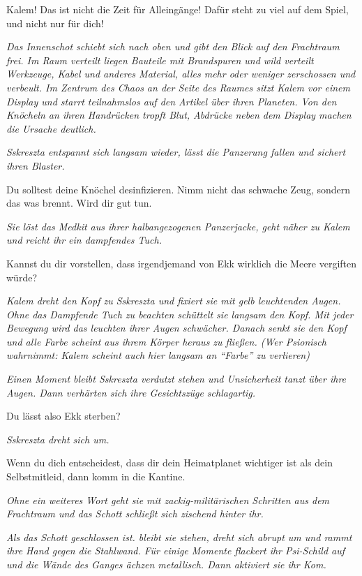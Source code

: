 \documentclass[11pt]{article}
\begin{document}
Kalem! Das ist nicht die Zeit für Alleingänge! Dafür steht zu viel auf
dem Spiel, und nicht nur für dich!

\emph{Das Innenschot schiebt sich nach oben und gibt den Blick auf den
Frachtraum frei. Im Raum verteilt liegen Bauteile mit Brandspuren und
wild verteilt Werkzeuge, Kabel und anderes Material, alles mehr oder
weniger zerschossen und verbeult. Im Zentrum des Chaos an der Seite des
Raumes sitzt Kalem vor einem Display und starrt teilnahmslos auf den
Artikel über ihren Planeten. Von den Knöcheln an ihren Handrücken tropft
Blut, Abdrücke neben dem Display machen die Ursache deutlich.}

\emph{Sskreszta entspannt sich langsam wieder, lässt die Panzerung
fallen und sichert ihren Blaster.}

Du solltest deine Knöchel desinfizieren. Nimm nicht das schwache Zeug,
sondern das was brennt. Wird dir gut tun.

\emph{Sie löst das Medkit aus ihrer halbangezogenen Panzerjacke, geht
näher zu Kalem und reicht ihr ein dampfendes Tuch.}

Kannst du dir vorstellen, dass irgendjemand von Ekk wirklich die Meere
vergiften würde?

\emph{Kalem dreht den Kopf zu Sskreszta und fixiert sie mit gelb
leuchtenden Augen. Ohne das Dampfende Tuch zu beachten schüttelt sie
langsam den Kopf. Mit jeder Bewegung wird das leuchten ihrer Augen
schwächer. Danach senkt sie den Kopf und alle Farbe scheint aus ihrem
Körper heraus zu fließen. (Wer Psionisch wahrnimmt: Kalem scheint auch
hier langsam an ``Farbe'' zu verlieren)}

\emph{Einen Moment bleibt Sskreszta verdutzt stehen und Unsicherheit
tanzt über ihre Augen. Dann verhärten sich ihre Gesichtszüge
schlagartig.}

Du lässt also Ekk sterben?

\emph{Sskreszta dreht sich um.}

Wenn du dich entscheidest, dass dir dein Heimatplanet wichtiger ist als
dein Selbstmitleid, dann komm in die Kantine.

\emph{Ohne ein weiteres Wort geht sie mit zackig-militärischen Schritten
aus dem Frachtraum und das Schott schließt sich zischend hinter ihr.}

\emph{Als das Schott geschlossen ist. bleibt sie stehen, dreht sich
abrupt um und rammt ihre Hand gegen die Stahlwand. Für einige Momente
flackert ihr Psi-Schild auf und die Wände des Ganges ächzen metallisch.
Dann aktiviert sie ihr Kom.}
\end{document}
